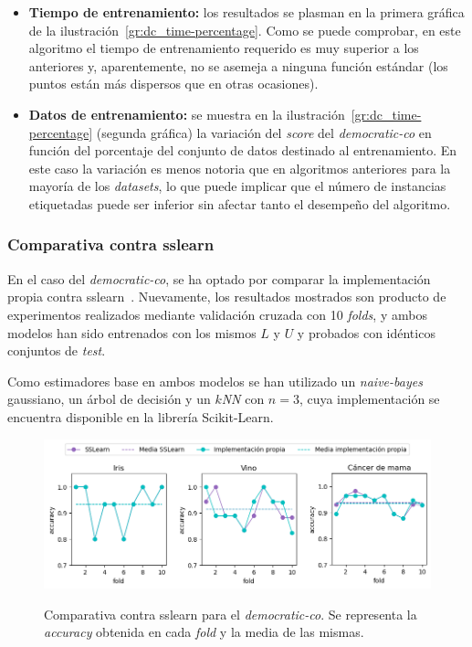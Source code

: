 \begin{itemize}
	\item \textbf{Tiempo de entrenamiento:} los resultados se plasman en la primera gráfica de la ilustración~\ref{gr:dc_time-percentage}. Como se puede comprobar, en este algoritmo el tiempo de entrenamiento requerido es muy superior a los anteriores y, aparentemente, no se asemeja a ninguna función estándar (los puntos están más dispersos que en otras ocasiones).
	
	\item \textbf{Datos de entrenamiento:} se muestra en la ilustración~\ref{gr:dc_time-percentage} (segunda gráfica) la variación del \textit{score} del \textit{democratic-co} en función del porcentaje del conjunto de datos destinado al entrenamiento. En este caso la variación es menos notoria que en algoritmos anteriores para la mayoría de los \textit{datasets}, lo que puede implicar que el número de instancias etiquetadas puede ser inferior sin afectar tanto el desempeño del algoritmo.
	
	
\end{itemize} 


\subsubsection{Comparativa contra sslearn}

En el caso del \textit{democratic-co}, se ha optado por comparar la implementación propia contra sslearn~\cite{sslearnRepo}. Nuevamente, los resultados mostrados son producto de experimentos realizados mediante validación cruzada con 10 \textit{folds}, y ambos modelos han sido entrenados con los mismos $L$ y $U$ y probados con idénticos conjuntos de \textit{test}.

Como estimadores base en ambos modelos se han utilizado un \textit{naive-bayes} gaussiano, un árbol de decisión y un \textit{$k$NN} con $n = 3$, cuya implementación se encuentra disponible en la librería Scikit-Learn.

\begin{figure}[h]
	\caption[\textit{Democratic-co}: comparativa contra sslearn]{Comparativa contra sslearn para el \textit{democratic-co}. Se representa la \textit{accuracy} obtenida en cada \textit{fold} y la media de las mismas.}
	\centering
	\includegraphics[width=\textwidth]{../img/memoria/5_democraticco_sslearn}
	\label{gr:dc_vs_sslearn}
\end{figure}

